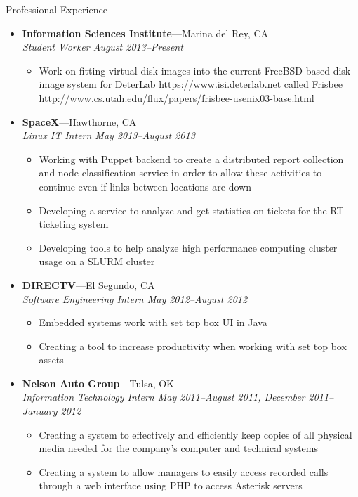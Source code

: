 \documentclass[8pt,oneside]{article}
\newenvironment{ressection}[1]{
	\vspace{4pt}
	{\fontfamily{phv}\selectfont\large#1}
	\begin{itemize}
	\vspace{3pt}
}{
	\end{itemize}
}
\newcommand{\ressubitem}[1]{
	\vspace{-1pt}
	\item \begin{flushleft} #1 \end{flushleft}
}
\newcommand{\resbigitem}[3]{
	\vspace{-5pt}
	\item
	\textbf{#1}---#2 \\
	\textit{#3}
}
\newenvironment{ressubsec}[3]{
	\resbigitem{#1}{#2}{#3}
	\vspace{-2pt}
	\begin{itemize}
}{
	\end{itemize}
}
\begin{document}
\begin{ressection}{Professional Experience}
        \begin{ressubsec}{Information Sciences Institute}{Marina del Rey, CA}{Student Worker August 2013--Present}
                \ressubitem{Work on fitting virtual disk images into the current FreeBSD based disk image system for DeterLab \url{https://www.isi.deterlab.net} called Frisbee \url{http://www.cs.utah.edu/flux/papers/frisbee-usenix03-base.html}}
        \end{ressubsec}
        \begin{ressubsec}{SpaceX}{Hawthorne, CA}{Linux IT Intern May 2013--August 2013}
                \ressubitem{Working with Puppet backend to create a distributed report collection and node classification service in order to allow these activities to continue even if links between locations are down}
                \ressubitem{Developing a service to analyze and get statistics on tickets for the RT ticketing system}
                \ressubitem{Developing tools to help analyze high performance computing cluster usage on a SLURM cluster}
        \end{ressubsec}
	\begin{ressubsec}{DIRECTV}{El Segundo, CA}{Software Engineering Intern May 2012--August 2012}
		\ressubitem{Embedded systems work with set top box UI in Java}
		\ressubitem{Creating a tool to increase productivity when working with set top box assets}
	\end{ressubsec}
	\begin{ressubsec}{Nelson Auto Group}{Tulsa, OK}{Information Technology Intern May 2011--August 2011, December 2011--January 2012}
		\ressubitem{Creating a system to effectively and efficiently keep copies of all physical media needed for the company's computer and technical systems}
		\ressubitem{Creating a system to allow managers to easily access recorded calls through a web interface using PHP to access Asterisk servers}
	\end{ressubsec}

	

\end{ressection}
\end{document}
